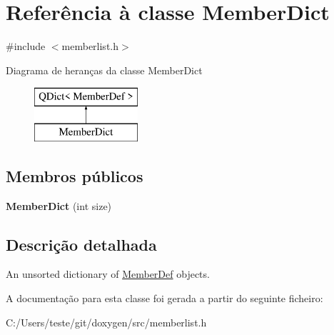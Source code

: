 \hypertarget{class_member_dict}{\section{Referência à classe Member\-Dict}
\label{class_member_dict}
}


{\ttfamily \#include $<$memberlist.\-h$>$}

Diagrama de heranças da classe Member\-Dict\begin{figure}[H]
\begin{center}
\leavevmode
\includegraphics[height=2.000000cm]{class_member_dict}
\end{center}
\end{figure}
\subsection*{Membros públicos}
\begin{DoxyCompactItemize}
\item 
\hypertarget{class_member_dict_a7410581936263530860db31e55a89987}{{\bfseries Member\-Dict} (int size)}\label{class_member_dict_a7410581936263530860db31e55a89987}

\end{DoxyCompactItemize}


\subsection{Descrição detalhada}
An unsorted dictionary of \hyperlink{class_member_def}{Member\-Def} objects. 

A documentação para esta classe foi gerada a partir do seguinte ficheiro\-:\begin{DoxyCompactItemize}
\item 
C\-:/\-Users/teste/git/doxygen/src/memberlist.\-h\end{DoxyCompactItemize}
